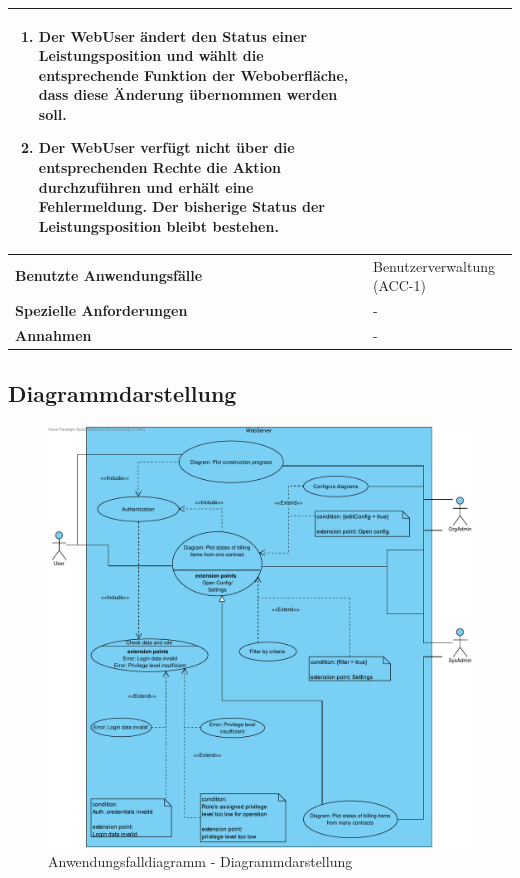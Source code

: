 \begin{longtable}[c]{|p{4cm}|p{10cm}|}
    \begin{enumerate}
        \item Der WebUser \"andert den Status einer Leistungsposition und w\"ahlt die entsprechende Funktion der Weboberfl\"ache,  dass diese \"Anderung \"ubernommen werden soll.
        \item Der WebUser verf\"ugt nicht \"uber die entsprechenden Rechte die Aktion durchzuf\"uhren und erh\"alt eine Fehlermeldung. Der bisherige Status der Leistungsposition bleibt bestehen.
    \end{enumerate}                                                                                                             \\ \hline
    \textbf{Benutzte Anwendungsfälle} & Benutzerverwaltung (ACC-1)                                                                         \\ \hline
    \textbf{Spezielle Anforderungen}  & -                                                                                                  \\ \hline
    \textbf{Annahmen}                 & -                                                                                                  \\ \hline
\end{longtable}

\clearpage

\subsection{Diagrammdarstellung}

\begin{figure}[h]
	\centering
	\includegraphics[width=\linewidth]{img/diagrams/Manage_Diagrams.pdf}
	\caption{Anwendungsfalldiagramm - Diagrammdarstellung}
	\label{fig:anwendungsfalldiagramm-dia-verwaltung}
\end{figure}

